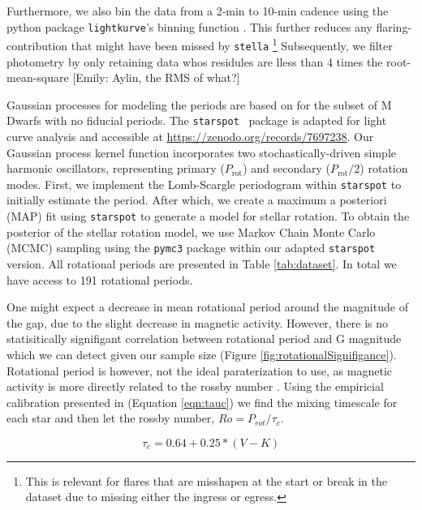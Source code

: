 Furthermore, we also bin the data from a 2-min to 10-min cadence using the
python package \texttt{lightkurve}'s binning function
\citep{LightkurveCollaborationLightkurve2018,GeertBarentsenKeplerGO2020}. This
further reduces any flaring-contribution that might have been missed by
\texttt{stella} \footnote{This is relevant for flares that are misshapen at the
start or break in the dataset due to missing either the ingress or egress.}
Subsequently, we filter photometry by only retaining data whos residules are
lless than 4 times the root-mean-square {\color{green}[Emily: Aylin, the RMS of
what?]} 

Gaussian processes for modeling the periods are based on
\citet{AngusInferring2018} for the subset of M Dwarfs with no fiducial periods.
The \texttt{starspot} \ package is adapted for light curve analysis
\citep{AngusRuthAngus2021} and accessible at
\url{https://zenodo.org/records/7697238}. Our Gaussian process kernel function
incorporates two stochastically-driven simple harmonic oscillators,
representing primary ($P_\textrm{rot}$) and secondary ($P_\textrm{rot}/2$)
rotation modes. First, we implement the Lomb-Scargle periodogram within
\texttt{starspot} to initially estimate the period. After which, we create a
maximum a posteriori (MAP) fit using \texttt{starspot} to generate a model for
stellar rotation. To obtain the posterior of the stellar rotation model, we use
Markov Chain Monte Carlo (MCMC) sampling using the \texttt{pymc3} package
\citep{SalvatierProbabilistic2016} within our adapted \texttt{starspot}
version. All rotational periods are presented in Table \ref{tab:dataset}. In
total we have access to 191 rotational periods.



One might expect a decrease in mean rotational period around the magnitude of
the gap, due to the slight decrease in magnetic activity. However, there is no
statisitically signifigant correlation between rotational period and G
magnitude which we can detect given our sample size (Figure
\ref{fig:rotationalSignifigance}). Rotational period is however, not the ideal
paraterization to use, as magnetic activity is more directly related to the
rossby number \citep[i.e.][]{}. Using the empiricial calibration presented in
\citet{Wright2018} (Equation \ref{eqn:tauc}) we find the mixing timescale for
each star and then let the rossby number, $Ro = P_{rot}/\tau_{c}$.

\begin{equation}
  \tau_{c} = 0.64 + 0.25 * (V-K)
\end{equation}

